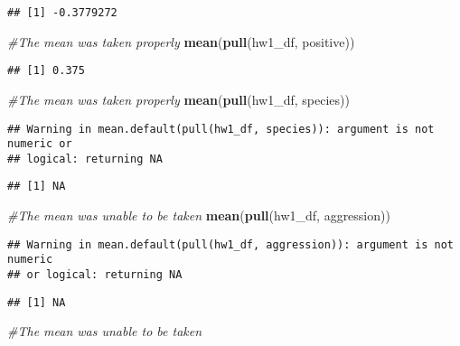 \documentclass[]{article}
\newenvironment{Shaded}{\begin{snugshade}}{\end{snugshade}}
\newcommand{\CommentTok}[1]{\textcolor[rgb]{0.56,0.35,0.01}{\textit{#1}}}
\newcommand{\KeywordTok}[1]{\textcolor[rgb]{0.13,0.29,0.53}{\textbf{#1}}}
\newcommand{\NormalTok}[1]{#1}
\begin{document}
\begin{verbatim}
## [1] -0.3779272
\end{verbatim}

\begin{Shaded}
\begin{Highlighting}[]
\CommentTok{#The mean was taken properly}
\KeywordTok{mean}\NormalTok{(}\KeywordTok{pull}\NormalTok{(hw1_df, positive))}
\end{Highlighting}
\end{Shaded}

\begin{verbatim}
## [1] 0.375
\end{verbatim}

\begin{Shaded}
\begin{Highlighting}[]
\CommentTok{#The mean was taken properly}
\KeywordTok{mean}\NormalTok{(}\KeywordTok{pull}\NormalTok{(hw1_df, species))}
\end{Highlighting}
\end{Shaded}

\begin{verbatim}
## Warning in mean.default(pull(hw1_df, species)): argument is not numeric or
## logical: returning NA
\end{verbatim}

\begin{verbatim}
## [1] NA
\end{verbatim}

\begin{Shaded}
\begin{Highlighting}[]
\CommentTok{#The mean was unable to be taken}
\KeywordTok{mean}\NormalTok{(}\KeywordTok{pull}\NormalTok{(hw1_df, aggression))}
\end{Highlighting}
\end{Shaded}

\begin{verbatim}
## Warning in mean.default(pull(hw1_df, aggression)): argument is not numeric
## or logical: returning NA
\end{verbatim}

\begin{verbatim}
## [1] NA
\end{verbatim}

\begin{Shaded}
\begin{Highlighting}[]
\CommentTok{#The mean was unable to be taken}
\end{Highlighting}
\end{Shaded}
\end{document}
